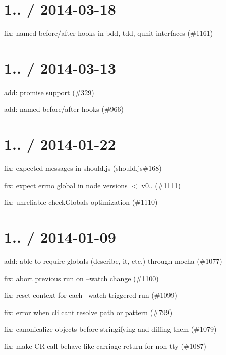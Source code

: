 \section*{1.. / 2014-\/03-\/18}


\begin{DoxyItemize}
\item fix\+: named before/after hooks in bdd, tdd, qunit interfaces (\#1161)
\end{DoxyItemize}

\section*{1.. / 2014-\/03-\/13}


\begin{DoxyItemize}
\item add\+: promise support (\#329)
\item add\+: named before/after hooks (\#966)
\end{DoxyItemize}

\section*{1.. / 2014-\/01-\/22}


\begin{DoxyItemize}
\item fix\+: expected messages in should.\+js (should.\+js\#168)
\item fix\+: expect errno global in node versions $<$ v0.. (\#1111)
\item fix\+: unreliable check\+Globals optimization (\#1110)
\end{DoxyItemize}

\section*{1.. / 2014-\/01-\/09}


\begin{DoxyItemize}
\item add\+: able to require globals (describe, it, etc.) through mocha (\#1077)
\item fix\+: abort previous run on --watch change (\#1100)
\item fix\+: reset context for each --watch triggered run (\#1099)
\item fix\+: error when cli can\textquotesingle{}t resolve path or pattern (\#799)
\item fix\+: canonicalize objects before stringifying and diffing them (\#1079)
\item fix\+: make CR call behave like carriage return for non tty (\#1087)
\end{DoxyItemize}

